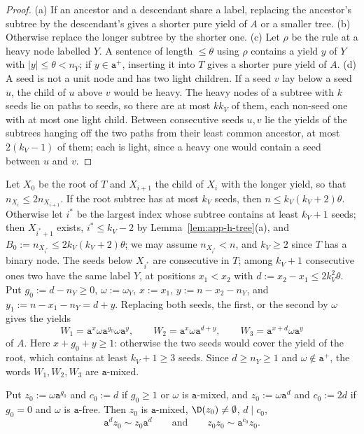 \begin{proof}
(a) If an ancestor and a descendant share a label, replacing the ancestor's
subtree by the descendant's gives a shorter pure yield of $A$ or a smaller
tree.  (b) Otherwise replace the longer subtree by the shorter one.  (c) Let
$\rho$ be the rule at a heavy node labelled $Y$.  A sentence of length
$\le\theta$ using $\rho$ contains a yield $y$ of $Y$ with $|y|\le\theta<n_Y$;
if $y\in\mathtt a^+$, inserting it into $T$ gives a shorter pure yield of $A$.
(d) A seed is not a unit node and has two light children.  If a seed $v$ lay
below a seed $u$, the child of $u$ above $v$ would be heavy.  The heavy nodes of
a subtree with $k$ seeds lie on paths to seeds, so there are at most $kk_V$ of
them, each non-seed one with at most one light child.  Between consecutive
seeds $u,v$ lie the yields of the subtrees hanging off the two paths from
their least common ancestor, at most $2(k_V-1)$ of them; each is light, since a
heavy one would contain a seed between $u$ and $v$.
\end{proof}

Let $X_0$ be the root of $T$ and $X_{i+1}$ the child of $X_i$ with the longer
yield, so that $n_{X_i}\le2n_{X_{i+1}}$.  If the root subtree has at most $k_V$
seeds, then $n\le k_V(k_V+2)\theta$.  Otherwise let $i^*$ be the largest index
whose subtree contains at least $k_V+1$ seeds; then $X_{i^*+1}$ exists,
$i^*\le k_V-2$ by Lemma~\ref{lem:app-h-tree}(a), and
$B_0:=n_{X_{i^*}}\le2k_V(k_V+2)\theta$; we may assume $n_{X_{i^*}}<n$, and
$k_V\ge2$ since $T$ has a binary node.  The seeds below $X_{i^*}$ are
consecutive in $T$; among $k_V+1$ consecutive ones two have the same label $Y$,
at positions $x_1<x_2$ with $d:=x_2-x_1\le2k_V^2\theta$.  Put $g_0:=d-n_Y\ge0$,
$\omega:=\omega_Y$, $x:=x_1$, $y:=n-x_2-n_Y$, and $y_1:=n-x_1-n_Y=d+y$.
Replacing both seeds, the first, or the second by $\omega$ gives the yields
\[
 W_1=\mathtt a^x\omega\mathtt a^{g_0}\omega\mathtt a^y,\qquad
 W_2=\mathtt a^x\omega\mathtt a^{d+y},\qquad
 W_3=\mathtt a^{x+d}\omega\mathtt a^y
\]
of $A$.  Here $x+g_0+y\ge1$: otherwise the two seeds would cover the yield of
the root, which contains at least $k_V+1\ge3$ seeds.  Since $d\ge n_Y\ge1$ and
$\omega\notin\mathtt a^+$, the words $W_1,W_2,W_3$ are $\mathtt a$-mixed.

\begin{lemma}[Base]
\label{lem:app-h-base}
Put $z_0:=\omega\mathtt a^{g_0}$ and $c_0:=d$ if $g_0\ge1$ or $\omega$ is
$\mathtt a$-mixed, and $z_0:=\omega\mathtt a^d$ and $c_0:=2d$ if $g_0=0$ and $\omega$
is $\mathtt a$-free.  Then $z_0$ is $\mathtt a$-mixed, $\D(z_0)\ne\emptyset$,
$d\mid c_0$,
\[
 \mathtt a^dz_0\sim z_0\mathtt a^d\qquad\text{and}\qquad z_0z_0\sim\mathtt a^{c_0}z_0.
\]
\end{lemma}

